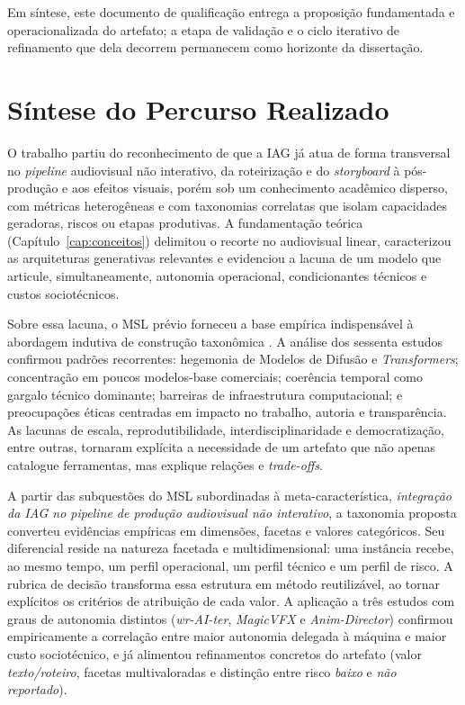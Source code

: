 Em síntese, este documento de qualificação entrega a proposição fundamentada e operacionalizada do artefato; a etapa de validação e o ciclo iterativo de refinamento que dela decorrem permanecem como horizonte da dissertação.

\section{Síntese do Percurso Realizado}

O trabalho partiu do reconhecimento de que a IAG já atua de forma transversal no \textit{pipeline} audiovisual não interativo, da roteirização e do \textit{storyboard} à pós-produção e aos efeitos visuais, porém sob um conhecimento acadêmico disperso, com métricas heterogêneas e com taxonomias correlatas que isolam capacidades geradoras, riscos ou etapas produtivas. A fundamentação teórica (Capítulo~\ref{cap:conceitos}) delimitou o recorte no audiovisual linear, caracterizou as arquiteturas generativas relevantes e evidenciou a lacuna de um modelo que articule, simultaneamente, autonomia operacional, condicionantes técnicos e custos sociotécnicos.

Sobre essa lacuna, o MSL prévio forneceu a base empírica indispensável à abordagem indutiva de construção taxonômica \citep{nickerson2013method}. A análise dos sessenta estudos confirmou padrões recorrentes: hegemonia de Modelos de Difusão e \textit{Transformers}; concentração em poucos modelos-base comerciais; coerência temporal como gargalo técnico dominante; barreiras de infraestrutura computacional; e preocupações éticas centradas em impacto no trabalho, autoria e transparência. As lacunas de escala, reprodutibilidade, interdisciplinaridade e democratização, entre outras, tornaram explícita a necessidade de um artefato que não apenas catalogue ferramentas, mas explique relações e \textit{trade-offs}.

A partir das subquestões do MSL subordinadas à meta-característica, \textit{integração da IAG no pipeline de produção audiovisual não interativo}, a taxonomia proposta converteu evidências empíricas em dimensões, facetas e valores categóricos. Seu diferencial reside na natureza facetada e multidimensional: uma instância recebe, ao mesmo tempo, um perfil operacional, um perfil técnico e um perfil de risco. A rubrica de decisão transforma essa estrutura em método reutilizável, ao tornar explícitos os critérios de atribuição de cada valor. A aplicação a três estudos com graus de autonomia distintos (\textit{wr-AI-ter}, \textit{MagicVFX} e \textit{Anim-Director}) confirmou empiricamente a correlação entre maior autonomia delegada à máquina e maior custo sociotécnico, e já alimentou refinamentos concretos do artefato (valor \textit{texto/roteiro}, facetas multivaloradas e distinção entre risco \textit{baixo} e \textit{não reportado}).

